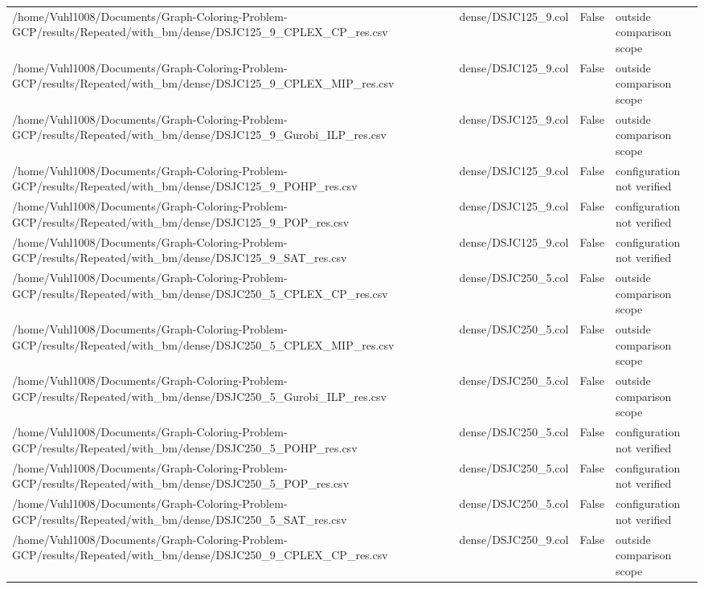 \begin{table}[htbp]
\begin{tabular}{llll}
/home/Vuhl1008/Documents/Graph-Coloring-Problem-GCP/results/Repeated/with\_bm/dense/DSJC125\_9\_CPLEX\_CP\_res.csv & dense/DSJC125\_9.col & False & outside comparison scope \\
/home/Vuhl1008/Documents/Graph-Coloring-Problem-GCP/results/Repeated/with\_bm/dense/DSJC125\_9\_CPLEX\_MIP\_res.csv & dense/DSJC125\_9.col & False & outside comparison scope \\
/home/Vuhl1008/Documents/Graph-Coloring-Problem-GCP/results/Repeated/with\_bm/dense/DSJC125\_9\_Gurobi\_ILP\_res.csv & dense/DSJC125\_9.col & False & outside comparison scope \\
/home/Vuhl1008/Documents/Graph-Coloring-Problem-GCP/results/Repeated/with\_bm/dense/DSJC125\_9\_POHP\_res.csv & dense/DSJC125\_9.col & False & configuration not verified \\
/home/Vuhl1008/Documents/Graph-Coloring-Problem-GCP/results/Repeated/with\_bm/dense/DSJC125\_9\_POP\_res.csv & dense/DSJC125\_9.col & False & configuration not verified \\
/home/Vuhl1008/Documents/Graph-Coloring-Problem-GCP/results/Repeated/with\_bm/dense/DSJC125\_9\_SAT\_res.csv & dense/DSJC125\_9.col & False & configuration not verified \\
/home/Vuhl1008/Documents/Graph-Coloring-Problem-GCP/results/Repeated/with\_bm/dense/DSJC250\_5\_CPLEX\_CP\_res.csv & dense/DSJC250\_5.col & False & outside comparison scope \\
/home/Vuhl1008/Documents/Graph-Coloring-Problem-GCP/results/Repeated/with\_bm/dense/DSJC250\_5\_CPLEX\_MIP\_res.csv & dense/DSJC250\_5.col & False & outside comparison scope \\
/home/Vuhl1008/Documents/Graph-Coloring-Problem-GCP/results/Repeated/with\_bm/dense/DSJC250\_5\_Gurobi\_ILP\_res.csv & dense/DSJC250\_5.col & False & outside comparison scope \\
/home/Vuhl1008/Documents/Graph-Coloring-Problem-GCP/results/Repeated/with\_bm/dense/DSJC250\_5\_POHP\_res.csv & dense/DSJC250\_5.col & False & configuration not verified \\
/home/Vuhl1008/Documents/Graph-Coloring-Problem-GCP/results/Repeated/with\_bm/dense/DSJC250\_5\_POP\_res.csv & dense/DSJC250\_5.col & False & configuration not verified \\
/home/Vuhl1008/Documents/Graph-Coloring-Problem-GCP/results/Repeated/with\_bm/dense/DSJC250\_5\_SAT\_res.csv & dense/DSJC250\_5.col & False & configuration not verified \\
/home/Vuhl1008/Documents/Graph-Coloring-Problem-GCP/results/Repeated/with\_bm/dense/DSJC250\_9\_CPLEX\_CP\_res.csv & dense/DSJC250\_9.col & False & outside comparison scope \\

\end{tabular}
\end{table}
